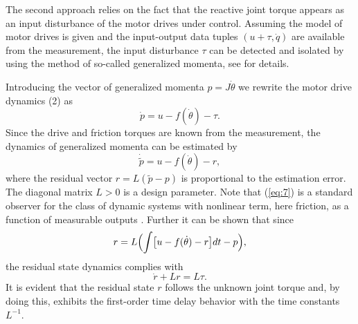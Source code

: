 \documentclass[a4paper, 10pt, conference]{ieeeconf}
\begin{document}
The second approach relies on the fact that the reactive joint
torque appears as an input disturbance of the motor drives under
control. Assuming the model of motor drives is given and the
input-output data tuples $(u+\tau, \dot{q})$ are available from
the measurement, the input disturbance $\tau$ can be detected and
isolated by using the method of so-called generalized momenta, see
\cite{DePersis01,DeLuca03} for details.

Introducing the vector of generalized momenta $p = J \dot{\theta}$
we rewrite the motor drive dynamics (2) as
\begin{equation}\label{eq:6}
\dot{p} = u - f(\dot{\theta}) - \tau.
\end{equation}
Since the drive and friction torques are known from the
measurement, the dynamics of generalized momenta can be estimated
by
\begin{equation}\label{eq:7}
\dot{\tilde{p}} = u - f(\dot{\theta}) - r,
\end{equation}
where the residual vector $r = L(\tilde{p} - p)$ is proportional
to the estimation error. The diagonal matrix $L > 0$ is a design
parameter. Note that (\ref{eq:7}) is a standard observer for the
class of dynamic systems with nonlinear term, here friction, as a
function of measurable outputs \cite{DeLuca03}. Further it can be
shown that since
\begin{equation}\label{eq:8}
r = L \Bigl( \int \bigl[ u - f(\dot{\theta}) - r \bigr]dt - p
\Bigr),
\end{equation}
the residual state dynamics complies with
\begin{equation}\label{eq:9}
\dot{r} + Lr = L \tau.
\end{equation}
It is evident that the residual state $r$ follows the unknown
joint torque and, by doing this, exhibits the first-order time
delay behavior with the time constants $L^{-1}$.
\end{document}
